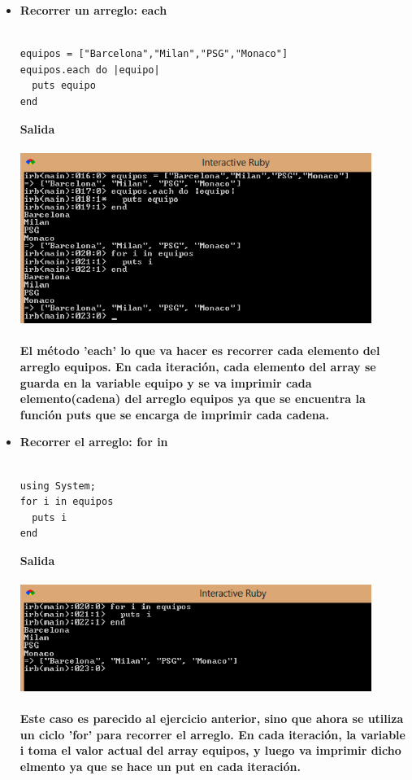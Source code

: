\documentclass[11pt]{article} %
\begin{document}
\begin{itemize}
     \item  {\bf Recorrer un arreglo: each}\\\\
\begin{lstlisting}[frame=single]  % Start your code-block
equipos = ["Barcelona","Milan","PSG","Monaco"]
equipos.each do |equipo|
  puts equipo
end
\end{lstlisting}
\bf Salida\\\\
        \includegraphics[width=0.9\textwidth]{./imagenes/RecorrerArregloEach}\\\\
     El método 'each' lo que va hacer es recorrer cada elemento del arreglo equipos. En cada iteración, cada elemento del array se guarda en la variable equipo y se va imprimir cada elemento(cadena) del arreglo equipos ya que se encuentra la función puts que se encarga de imprimir cada cadena.\\

	

     \item {\bf Recorrer el arreglo: for in}\\\\
\begin{lstlisting}[frame=single]  % Start your code-block
using System;
for i in equipos
  puts i
end
\end{lstlisting}
\bf Salida\\\\
	    \includegraphics[width=0.9\textwidth]{./imagenes/RecorridoForin}\\\\
     Este caso es parecido al ejercicio anterior, sino que ahora se utiliza un ciclo 'for' para recorrer el arreglo. En cada iteración, la variable i toma el valor actual del array equipos, y luego va imprimir dicho elmento ya que se hace un put en cada iteración.\\
\newpage


\end{itemize}
\end{document}
